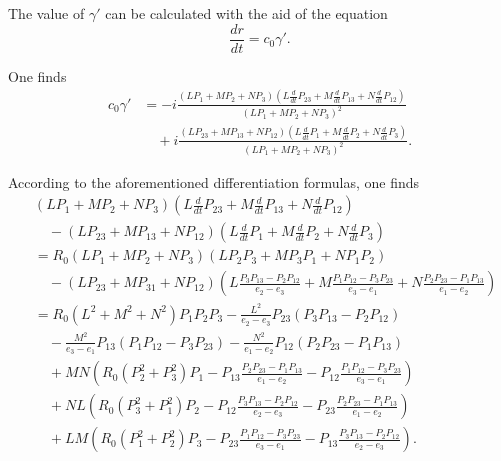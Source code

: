 \documentclass{article}
\begin{document}
The value of $\gamma'$ can be calculated with the aid of the equation
\[
\frac{dr}{dt} = c_0\gamma'.
\]

One finds
\begin{align*}
c_0\gamma' &= -i\frac{(LP_1 + MP_2 + NP_3)\left(L\frac{d}{dt}P_{23} + M\frac{d}{dt}P_{13} + N\frac{d}{dt}P_{12}\right)}{(LP_1 + MP_2 + NP_3)^2} \\
&\quad + i\frac{(LP_{23} + MP_{13} + NP_{12})\left(L\frac{d}{dt}P_1 + M\frac{d}{dt}P_2 + N\frac{d}{dt}P_3\right)}{(LP_1 + MP_2 + NP_3)^2}.
\end{align*}

According to the aforementioned differentiation formulas, one finds
\begin{align*}
&(LP_1 + MP_2 + NP_3)\left(L\frac{d}{dt}P_{23} + M\frac{d}{dt}P_{13} + N\frac{d}{dt}P_{12}\right) \\
&\quad - (LP_{23} + MP_{13} + NP_{12})\left(L\frac{d}{dt}P_1 + M\frac{d}{dt}P_2 + N\frac{d}{dt}P_3\right) \\
&= R_0(LP_1 + MP_2 + NP_3)(LP_2P_3 + MP_3P_1 + NP_1P_2) \\
&\quad - (LP_{23} + MP_{31} + NP_{12})\left(L\frac{P_3P_{13} - P_2P_{12}}{e_2 - e_3} + M\frac{P_1P_{12} - P_3P_{23}}{e_3 - e_1} + N\frac{P_2P_{23} - P_1P_{13}}{e_1 - e_2}\right) \\
&= R_0(L^2 + M^2 + N^2)P_1P_2P_3 - \frac{L^2}{e_2 - e_3}P_{23}(P_3P_{13} - P_2P_{12}) \\
&\quad - \frac{M^2}{e_3 - e_1}P_{13}(P_1P_{12} - P_3P_{23}) - \frac{N^2}{e_1 - e_2}P_{12}(P_2P_{23} - P_1P_{13}) \\
&\quad + MN\left(R_0(P_2^2 + P_3^2)P_1 - P_{13}\frac{P_2P_{23} - P_1P_{13}}{e_1 - e_2} - P_{12}\frac{P_1P_{12} - P_3P_{23}}{e_3 - e_1}\right) \\
&\quad + NL\left(R_0(P_3^2 + P_1^2)P_2 - P_{12}\frac{P_3P_{13} - P_2P_{12}}{e_2 - e_3} - P_{23}\frac{P_2P_{23} - P_1P_{13}}{e_1 - e_2}\right) \\
&\quad + LM\left(R_0(P_1^2 + P_2^2)P_3 - P_{23}\frac{P_1P_{12} - P_3P_{23}}{e_3 - e_1} - P_{13}\frac{P_3P_{13} - P_2P_{12}}{e_2 - e_3}\right).
\end{align*}
\end{document}
